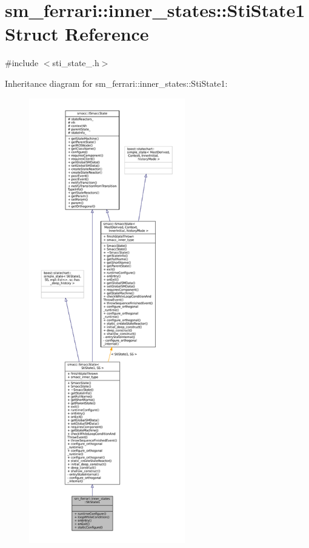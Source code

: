 \hypertarget{structsm__ferrari_1_1inner__states_1_1StiState1}{}\section{sm\+\_\+ferrari\+:\+:inner\+\_\+states\+:\+:Sti\+State1 Struct Reference}
\label{structsm__ferrari_1_1inner__states_1_1StiState1}


{\ttfamily \#include $<$sti\+\_\+state\+\_.\+h$>$}



Inheritance diagram for sm\+\_\+ferrari\+:\+:inner\+\_\+states\+:\+:Sti\+State1\+:
\nopagebreak
\begin{figure}[H]
\begin{center}
\leavevmode
\includegraphics[height=550pt]{structsm__ferrari_1_1inner__states_1_1StiState1__inherit__graph}
\end{center}
\end{figure}


